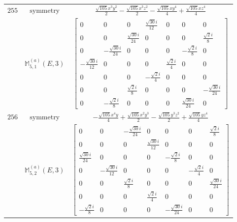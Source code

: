 \documentclass[fleqn,8pt,landscape]{jsarticle}
\begin{document}
\begin{longtable}{ccc}
$ 255 $ & $ \text{symmetry} $ & $ \frac{\sqrt{105} x^{3} y^{2}}{2} - \frac{\sqrt{105} x^{3} z^{2}}{2} - \frac{\sqrt{105} x y^{4}}{4} + \frac{\sqrt{105} x z^{4}}{4} $ \\
$  $ & $ \mathbb{M}_{5,1}^{(a)}(E,3) $ & $ \begin{bmatrix} 0 & 0 & 0 & \frac{\sqrt{30} i}{12} & 0 & 0 & 0 \\ 0 & 0 & \frac{\sqrt{30} i}{24} & 0 & 0 & 0 & \frac{\sqrt{2} i}{8} \\ 0 & - \frac{\sqrt{30} i}{24} & 0 & 0 & 0 & - \frac{\sqrt{2} i}{8} & 0 \\ - \frac{\sqrt{30} i}{12} & 0 & 0 & 0 & \frac{\sqrt{2} i}{4} & 0 & 0 \\ 0 & 0 & 0 & - \frac{\sqrt{2} i}{4} & 0 & 0 & 0 \\ 0 & 0 & \frac{\sqrt{2} i}{8} & 0 & 0 & 0 & - \frac{\sqrt{30} i}{24} \\ 0 & - \frac{\sqrt{2} i}{8} & 0 & 0 & 0 & \frac{\sqrt{30} i}{24} & 0 \end{bmatrix} $ \\ \hline
$ 256 $ & $ \text{symmetry} $ & $ - \frac{\sqrt{105} x^{4} y}{4} + \frac{\sqrt{105} x^{2} y^{3}}{2} - \frac{\sqrt{105} y^{3} z^{2}}{2} + \frac{\sqrt{105} y z^{4}}{4} $ \\
$  $ & $ \mathbb{M}_{5,2}^{(a)}(E,3) $ & $ \begin{bmatrix} 0 & 0 & - \frac{\sqrt{30} i}{24} & 0 & 0 & 0 & \frac{\sqrt{2} i}{8} \\ 0 & 0 & 0 & \frac{\sqrt{30} i}{12} & 0 & 0 & 0 \\ \frac{\sqrt{30} i}{24} & 0 & 0 & 0 & - \frac{\sqrt{2} i}{8} & 0 & 0 \\ 0 & - \frac{\sqrt{30} i}{12} & 0 & 0 & 0 & - \frac{\sqrt{2} i}{4} & 0 \\ 0 & 0 & \frac{\sqrt{2} i}{8} & 0 & 0 & 0 & \frac{\sqrt{30} i}{24} \\ 0 & 0 & 0 & \frac{\sqrt{2} i}{4} & 0 & 0 & 0 \\ - \frac{\sqrt{2} i}{8} & 0 & 0 & 0 & - \frac{\sqrt{30} i}{24} & 0 & 0 \end{bmatrix} $ \\ \hline
\end{longtable}
\end{document}

